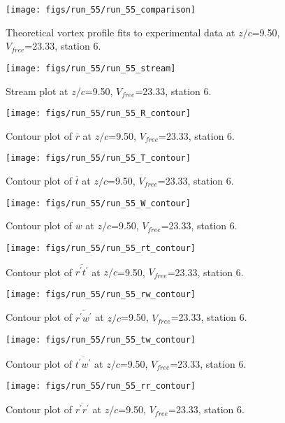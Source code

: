 \begin{figure}[H]
\centering
\texttt{[image: figs/run\_55/run\_55\_comparison]}
\caption{Theoretical vortex profile fits to experimental data at $z/c$=9.50, $V_{free}$=23.33, station 6.}
\end{figure}


\begin{figure}[H]
\centering
\texttt{[image: figs/run\_55/run\_55\_stream]}
\caption{Stream plot at $z/c$=9.50, $V_{free}$=23.33, station 6.}
\end{figure}


\begin{figure}[H]
\centering
\texttt{[image: figs/run\_55/run\_55\_R\_contour]}
\caption{Contour plot of $\overline{r}$ at $z/c$=9.50, $V_{free}$=23.33, station 6.}
\end{figure}


\begin{figure}[H]
\centering
\texttt{[image: figs/run\_55/run\_55\_T\_contour]}
\caption{Contour plot of $\overline{t}$ at $z/c$=9.50, $V_{free}$=23.33, station 6.}
\end{figure}


\begin{figure}[H]
\centering
\texttt{[image: figs/run\_55/run\_55\_W\_contour]}
\caption{Contour plot of $\overline{w}$ at $z/c$=9.50, $V_{free}$=23.33, station 6.}
\end{figure}


\begin{figure}[H]
\centering
\texttt{[image: figs/run\_55/run\_55\_rt\_contour]}
\caption{Contour plot of $\overline{r^\prime t^\prime}$ at $z/c$=9.50, $V_{free}$=23.33, station 6.}
\end{figure}


\begin{figure}[H]
\centering
\texttt{[image: figs/run\_55/run\_55\_rw\_contour]}
\caption{Contour plot of $\overline{r^\prime w^\prime}$ at $z/c$=9.50, $V_{free}$=23.33, station 6.}
\end{figure}


\begin{figure}[H]
\centering
\texttt{[image: figs/run\_55/run\_55\_tw\_contour]}
\caption{Contour plot of $\overline{t^\prime w^\prime}$ at $z/c$=9.50, $V_{free}$=23.33, station 6.}
\end{figure}


\begin{figure}[H]
\centering
\texttt{[image: figs/run\_55/run\_55\_rr\_contour]}
\caption{Contour plot of $\overline{r^\prime r^\prime}$ at $z/c$=9.50, $V_{free}$=23.33, station 6.}
\end{figure}


